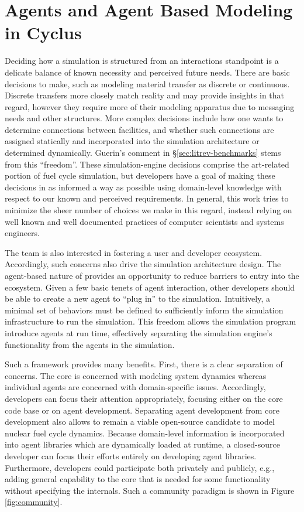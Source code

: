 
\section{Agents and Agent Based Modeling in Cyclus}\label{abm:abm}

Deciding how a simulation is structured from an interactions standpoint is a
delicate balance of known necessity and perceived future needs. There are basic
decisions to make, such as modeling material transfer as discrete or
continuous. Discrete transfers more closely match reality and may provide
insights in that regard, however they require more of their modeling apparatus
due to messaging needs and other structures. More complex decisions include how
one wants to determine connections between facilities, and whether such
connections are assigned statically and incorporated into the simulation
architecture or determined dynamically. Guerin's comment
in \S\ref{sec:litrev-benchmarks} stems from this ``freedom''. These
simulation-engine decisions comprise the art-related portion of fuel cycle
simulation, but developers have a goal of making these decisions in as informed
a way as possible using domain-level knowledge with respect to our known and
perceived requirements. In general, this work tries to minimize the sheer number
of choices we make in this regard, instead relying on well known and well
documented practices of computer scientists and systems engineers.

The \Cyclus team is also interested in fostering a user and developer ecosystem.
Accordingly, such concerns also drive the simulation architecture design. The
agent-based nature of \Cyclus provides an opportunity to reduce barriers to
entry into the ecosystem. Given a few basic tenets of agent interaction, other
developers should be able to create a new agent to ``plug in'' to the
simulation. Intuitively, a minimal set of behaviors must be defined to
sufficiently inform the simulation infrastructure to run the simulation. This
freedom allows the simulation program introduce agents at run time, effectively
separating the simulation engine's functionality from the agents in the
simulation.

Such a framework provides many benefits. First, there is a clear separation of
concerns. The \Cyclus core is concerned with modeling system dynamics whereas
individual agents are concerned with domain-specific issues. Accordingly,
developers can focus their attention appropriately, focusing either on the core
code base or on agent development. Separating agent development from core
development also allows \Cyclus to remain a viable open-source candidate to
model nuclear fuel cycle dynamics. Because domain-level information is
incorporated into agent libraries which are dynamically loaded at runtime, a
closed-source developer can focus their efforts entirely on developing agent
libraries. Furthermore, developers could participate both privately and
publicly, e.g., adding general capability to the \Cyclus core that is needed for
some functionality without specifying the internals. Such a community paradigm
is shown in Figure \ref{fig:community}.

